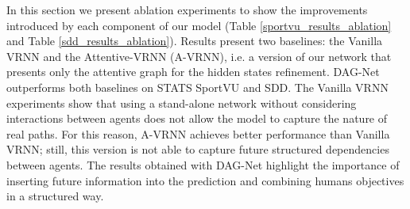 \documentclass[10pt,a4paper,conference]{IEEEtran}
\begin{document}
In this section we present ablation experiments to show the improvements introduced by each component of our model (Table \ref{sportvu_results_ablation} and Table \ref{sdd_results_ablation}). Results present two baselines: the Vanilla VRNN and the Attentive-VRNN (A-VRNN), i.e. a version of our network that presents only the attentive graph for the hidden states refinement. DAG-Net outperforms both baselines on STATS SportVU and SDD. The Vanilla VRNN experiments show that using a stand-alone network without considering interactions between agents does not allow the model to capture the nature of real paths. For this reason, A-VRNN achieves better performance than Vanilla VRNN; still, this version is not able to capture future structured dependencies between agents. The results obtained with DAG-Net highlight the importance of inserting future information into the prediction and combining humans objectives in a structured way.
\end{document}
